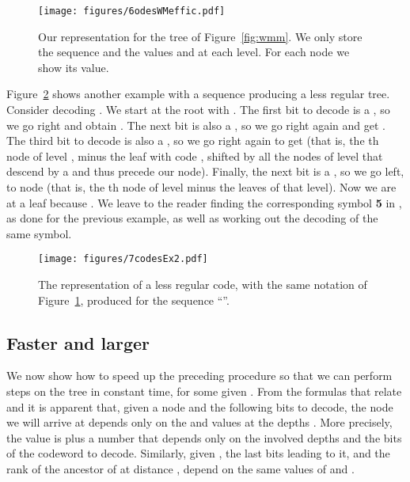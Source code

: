 \documentclass[preprint,12pt]{elsarticle}
\begin{document}
\begin{figure}[t]
\begin{center}
\texttt{[image: figures/6odesWMeffic.pdf]}
\end{center}
\vspace*{-5mm}
\caption{Our representation for the tree of Figure~\ref{fig:wmm}. We only
store the sequence  and the values  and  at each level.
For each node  we show its  value.}
\label{fig:wmmeffic}
\end{figure}

Figure~\ref{fig:wmmeffic2} shows another example with a sequence producing
a less regular tree.
Consider decoding . We start at the root with .
The first bit to decode is a , so we go right and obtain 
. The next bit is also
a , so we go right again and get . The third bit to decode is also a , so we 
go right again to get  
(that is, the th node of level , minus the leaf with code ,
shifted by all the  nodes of level  that descend by a  
and thus precede our node). Finally, the next bit is a , so we
go left, to node  (that is, the th 
node of level  minus the  leaves of that level). Now we are 
at a leaf because . We leave to the reader 
finding the corresponding symbol {\bf 5} in , as done for the
previous example, as well as working out the decoding of the same 
symbol.

\begin{figure}[t]
\begin{center}
\texttt{[image: figures/7codesEx2.pdf]}
\end{center}
\vspace*{-5mm}
\caption{The representation of a less regular code, with the same notation
of Figure~\ref{fig:wmmeffic}, produced for the sequence ``''.}
\label{fig:wmmeffic2}
\end{figure}

\subsection{Faster and larger}

We now show how to speed up the preceding procedure so that we 
can perform  steps on the tree in constant time, for some given .
From the formulas that relate  and  it is apparent that, given a node
 and the following  bits to decode, the node  we will arrive at 
depends only on the  and  values at the depths
. More precisely, the value  
is  plus a number that depends only on the involved 
depths and the  bits of the codeword to decode. Similarly, given ,
the last  bits leading to it, and the rank  of the ancestor  of
 at distance , depend on the same values of  and .
\end{document}
